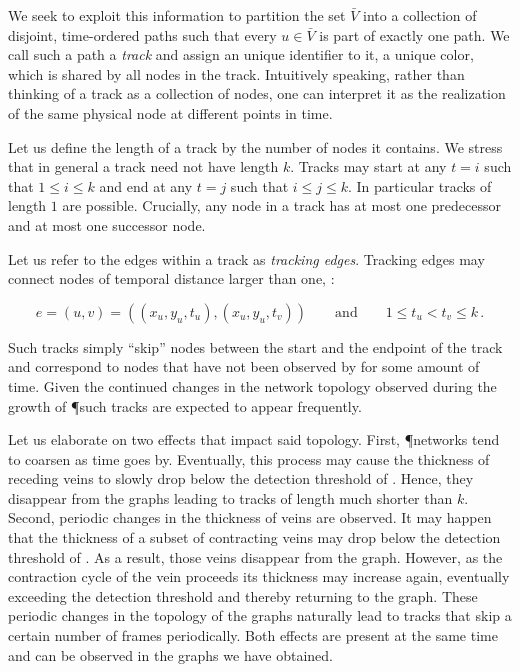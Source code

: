 		We seek to exploit this information to partition the set $\bar{V}$ into a collection of disjoint, time-ordered paths such that every $u \in \bar{V}$ is part of exactly one path. We call such a path a \emph{track} and assign an unique identifier to it, \eg a unique color, which is shared by all nodes in the track. Intuitively speaking, rather than thinking of a track as a collection of nodes, one can interpret it as the realization of the same physical node at different points in time.

		Let us define the length of a track by the number of nodes it contains. We stress that in general a track need not have length $k$. Tracks may start at any $t=i$ such that $1 \le i \le k$ and end at any $t=j$ such that $i \le j \le k$. In particular tracks of length $1$ are possible. Crucially, any node in a track has at most one predecessor and at most one successor node.

		Let us refer to the edges within a track as \emph{tracking edges}. Tracking edges may connect nodes of temporal distance larger than one, \ie:

		\begin{equation*}
			e = (u,v) = ((x_u,y_u,t_u), (x_u,y_u,t_v)) \qquad \text{and} \qquad 1 \le t_u < t_v \le k \,.
		\end{equation*}

		Such tracks simply ``skip'' nodes between the start and the endpoint of the track and correspond to nodes that have not been observed by \NEFI for some amount of time. Given the continued changes in the network topology observed during the growth of \P such tracks are expected to appear frequently. 

		Let us elaborate on two effects that impact said topology. First, \P networks tend to coarsen as time goes by. Eventually, this process may cause the thickness of receding veins to slowly drop below the detection threshold of \NEFI. Hence, they disappear from the graphs leading to tracks of length much shorter than $k$. Second, periodic changes in the thickness of veins are observed. It may happen that the thickness of a subset of contracting veins may drop below the detection threshold of \NEFI. As a result, those veins disappear from the graph. However, as the contraction cycle of the vein proceeds its thickness may increase again, eventually exceeding the detection threshold and thereby returning to the graph. These periodic changes in the topology of the graphs naturally lead to tracks that skip a certain number of frames periodically. Both effects are present at the same time and can be observed in the graphs we have obtained.

